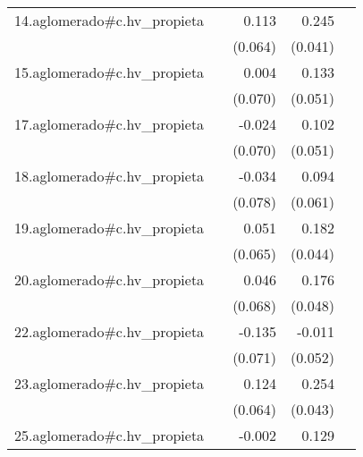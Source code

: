 {\begin{longtable}{l*{4}{D{.}{.}{-1}}}
\addlinespace
14.aglomerado#c.hv\_propieta&                     &       0.113         &       0.245\sym{***}&                     \\
            &                     &     (0.064)         &     (0.041)         &                     \\
\addlinespace
15.aglomerado#c.hv\_propieta&                     &       0.004         &       0.133\sym{**} &                     \\
            &                     &     (0.070)         &     (0.051)         &                     \\
\addlinespace
17.aglomerado#c.hv\_propieta&                     &      -0.024         &       0.102\sym{*}  &                     \\
            &                     &     (0.070)         &     (0.051)         &                     \\
\addlinespace
18.aglomerado#c.hv\_propieta&                     &      -0.034         &       0.094         &                     \\
            &                     &     (0.078)         &     (0.061)         &                     \\
\addlinespace
19.aglomerado#c.hv\_propieta&                     &       0.051         &       0.182\sym{***}&                     \\
            &                     &     (0.065)         &     (0.044)         &                     \\
\addlinespace
20.aglomerado#c.hv\_propieta&                     &       0.046         &       0.176\sym{***}&                     \\
            &                     &     (0.068)         &     (0.048)         &                     \\
\addlinespace
22.aglomerado#c.hv\_propieta&                     &      -0.135         &      -0.011         &                     \\
            &                     &     (0.071)         &     (0.052)         &                     \\
\addlinespace
23.aglomerado#c.hv\_propieta&                     &       0.124         &       0.254\sym{***}&                     \\
            &                     &     (0.064)         &     (0.043)         &                     \\
\addlinespace
25.aglomerado#c.hv\_propieta&                     &      -0.002         &       0.129\sym{**} &                     \\

\end{longtable}}
